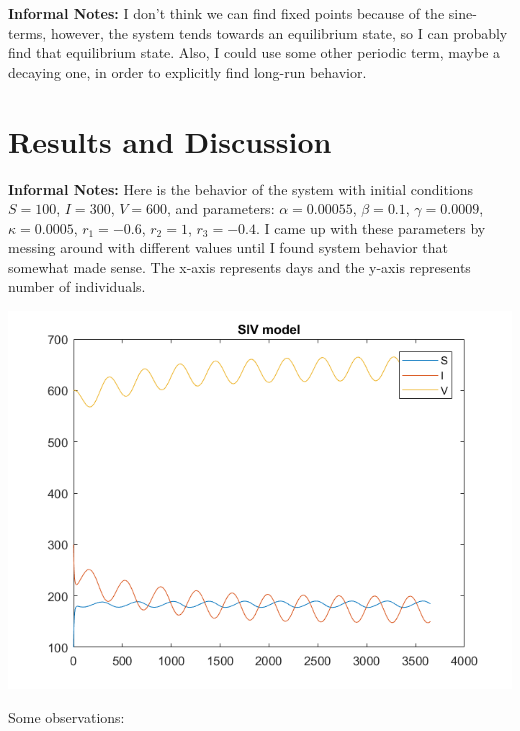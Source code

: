 \documentclass[11pt]{article}
\begin{document}
\textbf{Informal Notes: }I don't think we can find fixed points because of the sine-terms, however, the system tends towards an equilibrium state, so I can probably find that equilibrium state. Also, I could use some other periodic term, maybe a decaying one, in order to explicitly find long-run behavior.

\section*{Results and Discussion}

\textbf{Informal Notes: }Here is the behavior of the system with initial conditions $S = 100$, $I = 300$, $V = 600$, and parameters: $\alpha = 0.00055$, $\beta = 0.1$, $\gamma = 0.0009$, $\kappa = 0.0005$, $r_1 = -0.6$, $r_2 = 1$, $r_3 =  -0.4$. I came up with these parameters by messing around with different values until I found system behavior that somewhat made sense. The x-axis represents days and the y-axis represents number of individuals.
\begin{center}
\includegraphics[scale=0.5]{../Data/sivModel_example.png}
\end{center}

Some observations: \\
 \\
 \\
\end{document}
